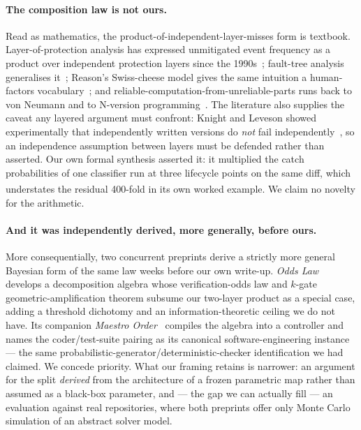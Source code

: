 \documentclass[sigconf,review,anonymous]{acmart}
\newcommand{\corr}{\textsuperscript{\dag}}
\begin{document}
\paragraph{The composition law is not ours.} Read as mathematics, the product-of-independent-layer-misses
form is textbook. Layer-of-protection analysis has expressed unmitigated event frequency as a
product over independent protection layers since the 1990s~\cite{dowell1998}; fault-tree analysis
generalises it~\cite{ruijters2015}; Reason's Swiss-cheese model gives the same intuition a
human-factors vocabulary~\cite{reason1990}; and reliable-computation-from-unreliable-parts runs
back to von Neumann and to N-version programming~\cite{avizienis1985}. The literature also supplies
the caveat any layered argument must confront: Knight and Leveson showed experimentally that
independently written versions do \emph{not} fail independently~\cite{knight1986}, so an
independence assumption between layers must be defended rather than asserted. Our own formal
synthesis asserted it: it multiplied the catch probabilities of one classifier run at three
lifecycle points on the same diff, which understates the residual 400-fold in its own worked
example\corr{}. We claim no novelty for the arithmetic.

\paragraph{And it was independently derived, more generally, before ours.} More consequentially,
two concurrent preprints derive a strictly more general Bayesian form of the same law weeks before
our own write-up. \emph{Odds Law}~\cite{aksu2026} develops a decomposition algebra whose
verification-odds law and $k$-gate geometric-amplification theorem subsume our two-layer product as
a special case, adding a threshold dichotomy and an information-theoretic ceiling we do not have.
Its companion \emph{Maestro Order}~\cite{aksu2026a} compiles the algebra into a controller and names
the coder/test-suite pairing as its canonical software-engineering instance --- the same
probabilistic-generator/deterministic-checker identification we had claimed. We concede priority.
What our framing retains is narrower: an argument for the split \emph{derived} from the architecture
of a frozen parametric map rather than assumed as a black-box parameter, and --- the gap we can
actually fill --- an evaluation against real repositories, where both preprints offer only Monte
Carlo simulation of an abstract solver model.
\end{document}
